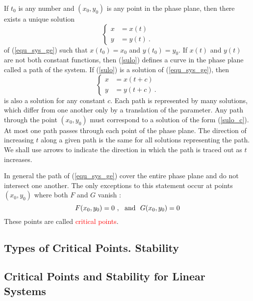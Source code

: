 \documentclass[12pt,a4paper]{article}
\begin{document}
If $t_0$ is any number and $(x_0,y_0)$ is any point in the phase plane, then there exists a unique solution
\begin{equation}
\left\{
\begin{aligned}
x &= x(t) \\
y &= y(t) ~.
\label{sulo}
\end{aligned}
\right.
\end{equation}
of (\ref{equ_sys_ge}) such that $x(t_0) = x_0$ and $y(t_0) = y_0$. If $x(t)$ and $y(t)$ are not both constant functions, then (\ref{sulo}) defines a curve in the phase plane called a path of the system. If (\ref{sulo}) is a solution of (\ref{equ_sys_ge}), then 
\begin{equation}
\left\{
\begin{aligned}
x &= x(t +c) \\
y &= y(t +c) ~.
\label{sulo_c}
\end{aligned}
\right.
\end{equation}
is also a solution for any constant $c$. Each path is represented by many solutions, which differ from one another only by a translation of the parameter. Any path through the point $(x_0,y_0)$ must correspond to a solution of the form (\ref{sulo_c}). At most one path passes through each point of the phase plane. The direction of increasing $t$ along a given path is the same for all solutions representing the path. We shall use arrows to indicate the direction in which the path is traced out as $t$ increases.

In general the path of (\ref{equ_sys_ge}) cover the entire phase plane and do not intersect one another. The only exceptions to this statement occur at points $(x_0, y_0)$ where both $F$ and $G$ vanish :
\begin{equation}
F(x_0, y_0) = 0 ~, ~~{\rm and} ~~ G(x_0, y_0) = 0 
\end{equation}
These points are called  \textcolor{red}{critical points}.










\subsection{Types of Critical Points. Stability}


\subsection{Critical Points and Stability for Linear Systems}
\end{document}
